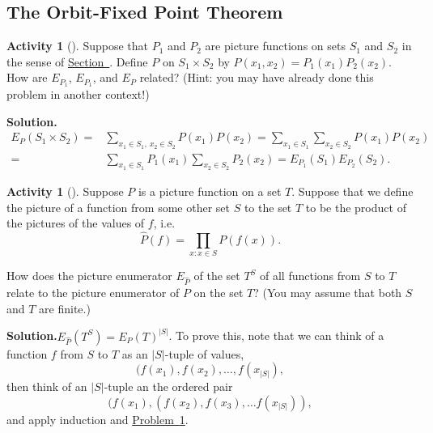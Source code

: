 \documentclass[10pt,]{book}
\theoremstyle{plain}
\theoremstyle{definition}
\newtheorem{activity}[project]{Activity}
\numberwithin{equation}{chapter}
\newcommand{\amp}{&}
\begin{document}
\subsection[{The Orbit-Fixed Point Theorem}]{The Orbit-Fixed Point Theorem}\label{subsection-67}
\begin{activity}[]\label{ProdPrincPictureEnumerators}
Suppose that \(P_1\) and \(P_2\) are picture functions on sets \(S_1\) and \(S_2\) in the sense of \hyperref[picturefunction]{Section~}. Define \(P\) on \(S_1 \times
S_2\) by \(P(x_1,x_2) = P_1(x_1)P_2(x_2)\). How are \(E_{P_1}\), \(E_{P_1}\), and \(E_{P}\) related? (Hint: you may have already done this problem in another context!)%
\par\medskip\noindent%
\textbf{Solution.}\quad %
\begin{align*}
E_P(S_1\times S_2) =\amp \sum_{x_1\in S_1,\ x_2\in
S_2}P(x_1)P(x_2)=\sum_{x_1\in S_1}\sum_{x_2 \in S_2}P(x_1)P(x_2)\\
=\amp  \sum_{x_1\in
S_1}P_1(x_1)\sum_{x_2 \in S_2}P_2(x_2)=E_{P_1}(S_1)E_{P_2}(S_2).
\end{align*}
\end{activity}
\begin{activity}[]\label{PictureEnumeratorforFunctions}
Suppose \(P\) is a picture function on a set \(T\). Suppose that we define the picture of a function from some other set \(S\) to the set \(T\) to be the product of the pictures of the values of \(f\), i.e.%
\begin{equation*}
\hat P(f) = \prod_{x:x\in S}P(f(x)).
\end{equation*}
%
\par
How does the picture enumerator \(E_{\hat P}\) of the set \(T^S\) of all functions from \(S\) to \(T\) relate to the picture enumerator of \(P\) on the set \(T\)? (You may assume that both \(S\) and \(T\) are finite.)%
\par\medskip\noindent%
\textbf{Solution.}\quad \(E_{\hat P}(T^S)=E_P(T)^{|S|}\). To prove this, note that we can think of a function \(f\) from \(S\) to \(T\) as an \(|S|\)-tuple of values,%
\begin{equation*}
(f(x_1),f(x_2),\ldots,
f(x_{|S|}),
\end{equation*}
then think of an \(|S|\)-tuple an the ordered pair%
\begin{equation*}
(f(x_1),(f(x_2),
f(x_3),\ldots f(x_{|S|})),
\end{equation*}
and apply induction and \hyperref[ProdPrincPictureEnumerators]{Problem~\ref{ProdPrincPictureEnumerators}}.%
\end{activity}
\end{document}
